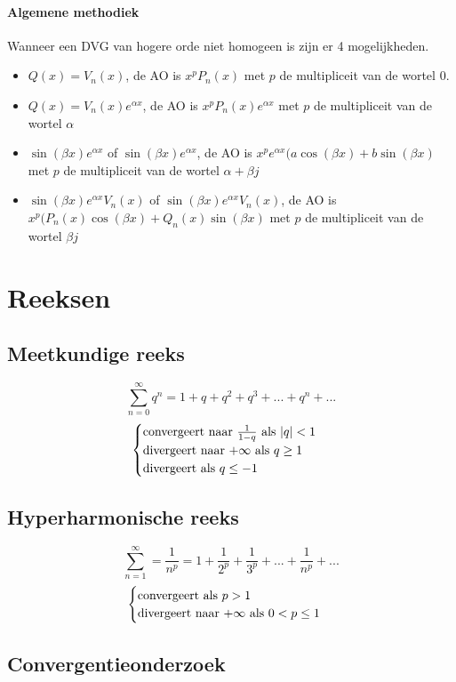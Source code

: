 \documentclass{report}
\begin{document}
\subsubsection*{Algemene methodiek}
Wanneer een DVG van hogere orde niet homogeen is zijn er 4 mogelijkheden.
\begin{itemize}
 \item $Q(x) = V_n(x)$, de AO is $x^pP_n(x)$ met $p$ de multipliceit van de wortel 0.
 \item $Q(x) = V_n(x)e^{\alpha x}$, de AO is $x^pP_n(x)e^{\alpha x}$ met $p$ de multipliceit van de wortel $\alpha$
 \item $\sin (\beta x)e^{\alpha x}$ of $\sin (\beta x)e^{\alpha x}$, de AO is $x^pe^{\alpha x}(a\cos(\beta x) + b\sin(\beta x)$ met $p$ de multipliceit van de wortel $\alpha + \beta j$
 \item $\sin (\beta x)e^{\alpha x}V_n(x)$ of $\sin (\beta x)e^{\alpha x}V_n(x)$, de AO is $x^p(P_n(x)\cos(\beta x) + Q_n(x)\sin(\beta x)$ met $p$ de multipliceit van de wortel $\beta j$
\end{itemize}

\chapter*{Reeksen}
\section*{Meetkundige reeks}
$$\sum_{n = 0}^{\infty} q^n = 1 + q + q^2 + q^3 + ... + q^n + ...$$
$$\begin{cases}
   \hbox{convergeert naar } \frac{1}{1 - q} \hbox{ als } |q| < 1 \\
   \hbox{divergeert naar +}\infty \hbox{ als } q \geq 1 \\
   \hbox{divergeert als } q \leq -1
  \end{cases}
$$
\section*{Hyperharmonische reeks}
$$\sum_{n = 1}^{\infty} = \frac{1}{n^p} = 1 + \frac{1}{2^p} + \frac{1}{3^p} + ... + \frac{1}{n^p} + ...$$
$$\begin{cases}
   \hbox{convergeert als } p > 1 \\
   \hbox{divergeert naar +}\infty \hbox{ als } 0 < p \leq 1 \\
  \end{cases}
$$

\section*{Convergentieonderzoek}
\end{document}
